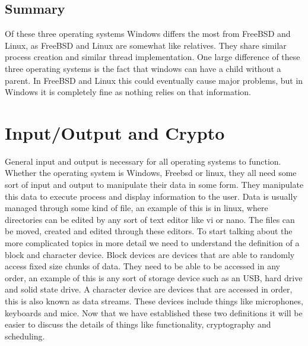 \documentclass[onecolumn, draftclsnofoot, 10pt, titlepage, compsoc]{IEEEtran}
\begin{document}
\subsection{Summary}
Of these three operating systems Windows differs the most from FreeBSD and Linux, as FreeBSD and Linux are somewhat like relatives. They share similar process creation and similar thread implementation. One large difference of these three operating systems is the fact that windows can have a child without a parent. In FreeBSD and Linux this could eventually cause major problems, but in Windows it is completely fine as nothing relies on that information.

\section{Input/Output and Crypto}
General input and output is necessary for all operating systems to function. Whether the operating system is Windows, Freebsd or linux, they all need some sort of input and output to manipulate their data in some form. They manipulate this data to execute process and display information to the user. Data is usually managed through some kind of file, an example of this is in linux, where directories can be edited by any sort of text editor like vi or nano. The files can be moved, created and edited through these editors. To start talking about the more complicated topics in more detail we need to understand the definition of a block and character device. Block devices are devices that are able to randomly access fixed size chunks of data. They need to be able to be accessed in any order, an example of this is any sort of storage device such as an USB, hard drive and solid state drive. A character device are devices that are accessed in order, this is also known as data streams. These devices include things like microphones, keyboards and mice. Now that we have established these two definitions it will be easier to discuss the details of things like functionality, cryptography and scheduling.
\end{document}
